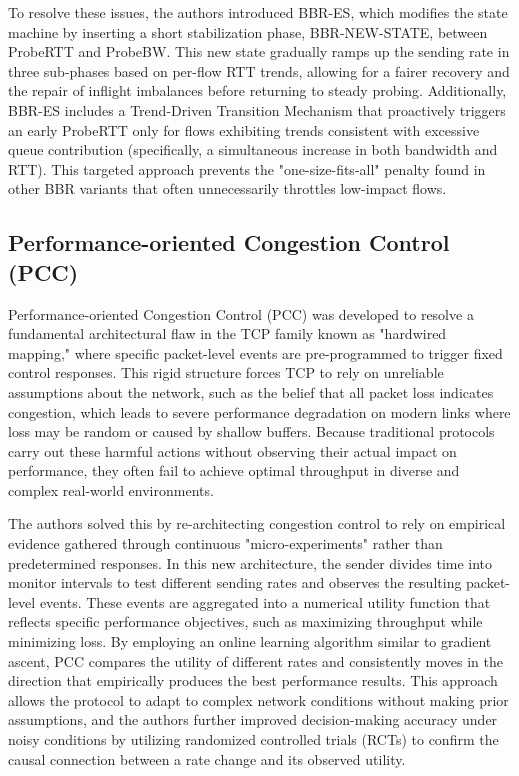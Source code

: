 \documentclass[conference]{IEEEtran}
\begin{document}
To resolve these issues, the authors introduced BBR-ES, which modifies the state machine by inserting a short stabilization phase, BBR-NEW-STATE, between ProbeRTT and ProbeBW. 
This new state gradually ramps up the sending rate in three sub-phases based on per-flow RTT trends, allowing for a fairer recovery and the repair of inflight imbalances before returning to steady probing. 
Additionally, BBR-ES includes a Trend-Driven Transition Mechanism that proactively triggers an early ProbeRTT only for flows exhibiting trends consistent with excessive queue contribution (specifically, a simultaneous increase in both bandwidth and RTT). 
This targeted approach prevents the "one-size-fits-all" penalty found in other BBR variants that often unnecessarily throttles low-impact flows.

\subsection{Performance-oriented Congestion Control (PCC)}

Performance-oriented Congestion Control (PCC) was developed to resolve a fundamental architectural flaw in the TCP family known as "hardwired mapping," where specific packet-level events are pre-programmed to trigger fixed control responses\cite{PCC}. 
This rigid structure forces TCP to rely on unreliable assumptions about the network, such as the belief that all packet loss indicates congestion, which leads to severe performance degradation on modern links where loss may be random or caused by shallow buffers.
Because traditional protocols carry out these harmful actions without observing their actual impact on performance, they often fail to achieve optimal throughput in diverse and complex real-world environments.

The authors solved this by re-architecting congestion control to rely on empirical evidence gathered through continuous "micro-experiments" rather than predetermined responses. 
In this new architecture, the sender divides time into monitor intervals to test different sending rates and observes the resulting packet-level events. 
These events are aggregated into a numerical utility function that reflects specific performance objectives, such as maximizing throughput while minimizing loss. By employing an online learning algorithm similar to gradient ascent, PCC compares the utility of different rates and consistently moves in the direction that empirically produces the best performance results. 
This approach allows the protocol to adapt to complex network conditions without making prior assumptions, and the authors further improved decision-making accuracy under noisy conditions by utilizing randomized controlled trials (RCTs) to confirm the causal connection between a rate change and its observed utility.
\end{document}
